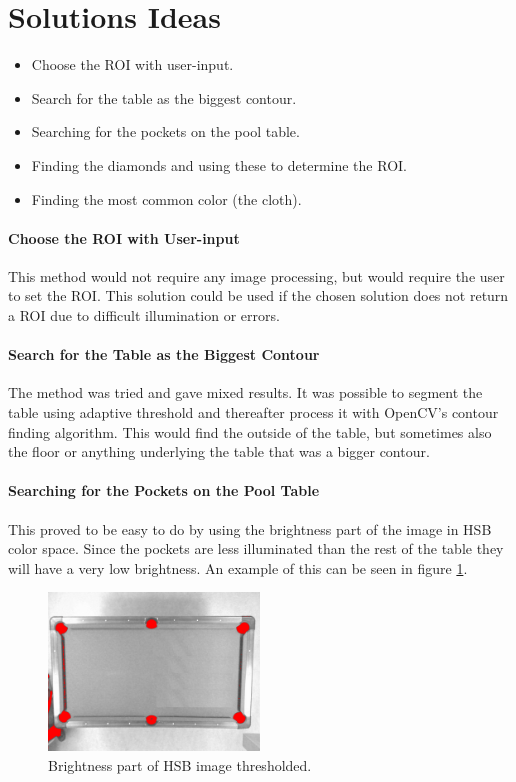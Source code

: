 \section{Solutions Ideas}

\begin{itemize}
\setlength{\itemsep}{0mm}
	\item Choose the ROI with user-input.
	\item Search for the table as the biggest contour.
	\item Searching for the pockets on the pool table.
	\item Finding the diamonds and using these to determine the ROI.
	\item Finding the most common color (the cloth).
\end{itemize}

\paragraph{Choose the ROI with User-input}
This method would not require any image processing, but would require the user to set the ROI. This solution could be used if the chosen solution does not return a ROI due to difficult illumination or errors.

\paragraph{Search for the Table as the Biggest Contour}
The method was tried and gave mixed results. It was possible to segment the table using adaptive threshold and thereafter process it with OpenCV's contour finding algorithm. This would find the outside of the table, but sometimes also the floor or anything underlying the table that was a bigger contour.

\paragraph{Searching for the Pockets on the Pool Table}
This proved to be easy to do by using the brightness part of the image in HSB color space. Since the pockets are less illuminated than the rest of the table they will have a very low brightness. An example of this can be seen in figure \ref{fig:value_thres}.

\begin{figure}[htpb]
\begin{center}
\leavevmode
\includegraphics[width=0.5\textwidth]{images/value_thres}
\end{center}
\caption{Brightness part of HSB image thresholded.}
\label{fig:value_thres}
\end{figure}

